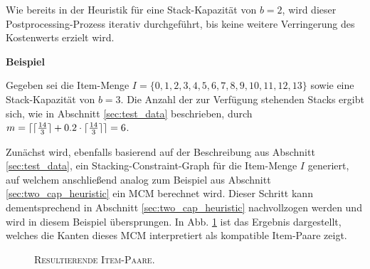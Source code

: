 Wie bereits in der Heuristik für eine Stack-Kapazität von $b = 2$, wird dieser Postprocessing-Prozess
iterativ durchgeführt, bis keine weitere Verringerung des Kostenwerts erzielt wird.

\textbf{Beispiel}

Gegeben sei die Item-Menge $I = \{0, 1, 2, 3, 4, 5, 6, 7, 8, 9, 10, 11, 12, 13\}$ sowie eine Stack-Kapazität von $b = 3$.
Die Anzahl der zur Verfügung stehenden Stacks ergibt sich, wie in Abschnitt \ref{sec:test_data} beschrieben,
durch $m = \lceil\lceil\frac{14}{3}\rceil + 0.2 \cdot  \lceil\frac{14}{3}\rceil\rceil = 6$.

Zunächst wird, ebenfalls basierend auf der Beschreibung aus Abschnitt \ref{sec:test_data}, ein Stacking-Constraint-Graph
für die Item-Menge $I$ generiert, auf welchem anschließend analog zum Beispiel aus Abschnitt \ref{sec:two_cap_heuristic} ein
\textsc{MCM} berechnet wird. Dieser Schritt kann dementsprechend in Abschnitt \ref{sec:two_cap_heuristic} nachvollzogen werden
und wird in diesem Beispiel übersprungen. In Abb. \ref{fig:item_pairs_example_b=3} ist das Ergebnis dargestellt,
welches die Kanten dieses \textsc{MCM} interpretiert als kompatible Item-Paare zeigt.

\begin{figure}[H]
\centering
{}
\caption{\textsc{Resultierende Item-Paare}.}
\label{fig:item_pairs_example_b=3}
\end{figure}

